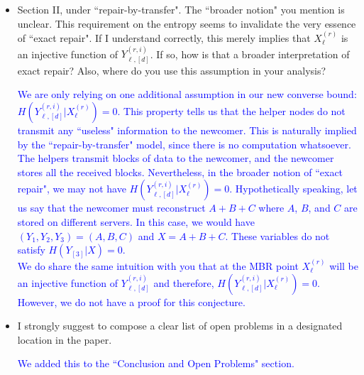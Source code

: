 \documentclass{article}
\begin{document}
\begin{itemize}
\item      Section II, under ``repair-by-transfer". The ``broader notion" you mention is unclear. This requirement on the entropy seems to invalidate the very essence of ``exact repair". If I understand correctly, this merely implies that $X_\ell^{(r)}$ is an injective function of $Y_{\ell,[d]}^{(r,i)}$. If so, how is that a broader interpretation of exact repair? Also, where do you use this assumption in your analysis?

\textcolor{blue}{We are only relying on one additional assumption in our new converse bound: $H(Y_{\ell,[d]}^{(r,i)}|X_\ell^{(r)}) = 0$. This property tells us that the helper nodes do not transmit any ``useless" information to the newcomer. This is naturally implied by the ``repair-by-transfer" model, since there is no computation whatsoever. The helpers transmit blocks of data to the newcomer, and the newcomer stores all the received blocks. Nevertheless, in the broader notion of ``exact repair", we may not have $H(Y_{\ell,[d]}^{(r,i)}|X_\ell^{(r)}) = 0$. Hypothetically speaking, let us say that the newcomer must reconstruct $A+B+C$ where $A$, $B$, and $C$ are stored on different servers. In this case, we would have $(Y_1,Y_2,Y_3) = (A,B,C)$ and $X = A +B + C$. These variables do not satisfy $H(Y_{[3]}|X) = 0$.\\
 We do share the same intuition with you that at the MBR point $X_\ell^{(r)}$ will be an injective function of $Y_{\ell,[d]}^{(r,i)}$ and therefore, $H(Y_{\ell,[d]}^{(r,i)}|X_\ell^{(r)}) = 0$. However, we do not have a proof for this conjecture.}

\item       I strongly suggest to compose a clear list of open problems in a designated location in the paper. 

\textcolor{blue}{We added this to the ``Conclusion and Open Problems" section.}

\end{itemize}
\end{document}
